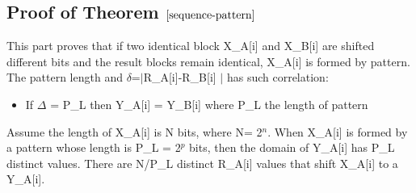 \documentclass{article}
\begin{document}
%
\subsection{Proof of Theorem $\ref{sequence-pattern}$}
This part proves that if two identical block X\_A[i]  and X\_B[i] are shifted different bits and the result blocks remain identical, X\_A[i] is formed by pattern. The pattern length and $\delta$=$\mid$R\_A[i]-R\_B[i] $\mid$ has such correlation:
\begin{itemize}
	\item If $\Delta$ = P\_L then Y\_A[i] = Y\_B[i] where P\_L the length of pattern
\end{itemize}
Assume the length of X\_A[i] is N bits, where N= 2$^n$. When X\_A[i] is formed by a pattern whose length is P\_L = 2$^p$ bits, then the domain of Y\_A[i] has P\_L distinct values. There are N/P\_L distinct R\_A[i] values that shift X\_A[i] to a Y\_A[i].  
\end{document}
